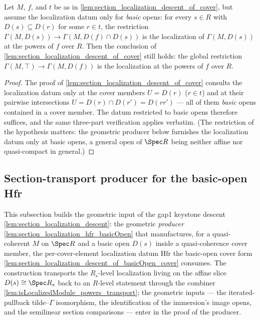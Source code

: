 
\begin{lemma}
  \label{lem:section_localization_descent_of_basicOpen_cover}
  \leanok
  Let \(M\), \(f\), and \(t\) be as in \cref{lem:section_localization_descent_of_cover},
  but assume the localization datum only for \emph{basic} opens: for every \(s \in R\)
  with \(D(s) \subseteq D(r)\) for some \(r \in t\), the restriction
  \(\Gamma(M, D(s)) \to \Gamma(M, D(f) \cap D(s))\) is the localization of
  \(\Gamma(M, D(s))\) at the powers of \(f\) over \(R\). Then the conclusion of
  \cref{lem:section_localization_descent_of_cover} still holds: the global restriction
  \(\Gamma(M, \top) \to \Gamma(M, D(f))\) is the localization at the powers of \(f\)
  over \(R\).
\end{lemma}
\begin{proof}
  \leanok
  The proof of \cref{lem:section_localization_descent_of_cover} consults the
  localization datum only at the cover members \(U = D(r)\) (\(r \in t\)) and at their
  pairwise intersections \(U = D(r) \cap D(r') = D(r r')\) — all of them \emph{basic}
  opens contained in a cover member. The datum restricted to basic opens therefore
  suffices, and the same three-part verification applies verbatim. (The restriction of
  the hypothesis matters: the geometric producer below furnishes the localization datum
  only at basic opens, a general open of \(\Spec R\) being neither affine nor
  quasi-compact in general.)
\end{proof}


\subsection{Section-transport producer for the basic-open Hfr}

This subsection builds the geometric input of the gap1 keystone descent
\cref{lem:section_localization_descent}: the geometric \emph{producer}
\cref{lem:section_localization_hfr_basicOpen} that manufactures, for a quasi-coherent \(M\) on
\(\Spec R\) and a basic open \(D(s)\) inside a quasi-coherence cover member, the per-cover-element
localization datum \(\mathrm{Hfr}\) the basic-open cover form
\cref{lem:section_localization_descent_of_basicOpen_cover} consumes. The construction transports the
\(R_s\)-level localization living on the affine slice \(D(s) \cong \Spec R_s\) back to an
\(R\)-level statement through the combiner \cref{lem:isLocalizedModule_powers_transport}; the
geometric inputs --- the iterated-pullback tilde--\(\Gamma\) isomorphism, the identification of the
immersion's image opens, and the semilinear section comparisons --- enter in the proof of the
producer.

